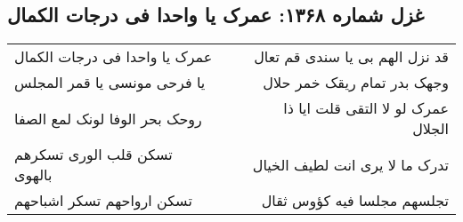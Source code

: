 \begin{center}
\section*{غزل شماره ۱۳۶۸: عمرک یا واحدا فی درجات الکمال}
\label{sec:1368}
\begin{longtable}{l p{0.5cm} r}
عمرک یا واحدا فی درجات الکمال
&&
قد نزل الهم بی یا سندی قم تعال
\\
یا فرحی مونسی یا قمر المجلس
&&
وجهک بدر تمام ریقک خمر حلال
\\
روحک بحر الوفا لونک لمع الصفا
&&
عمرک لو لا التقی قلت ایا ذا الجلال
\\
تسکن قلب الوری تسکرهم بالهوی
&&
تدرک ما لا یری انت لطیف الخیال
\\
تسکن ارواحهم تسکر اشباحهم
&&
تجلسهم مجلسا فیه کؤوس ثقال
\\
\end{longtable}
\end{center}
